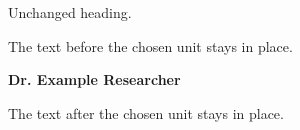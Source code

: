 \documentclass[11pt]{article}
\newcommand{\PersonName}{Dr. Example Researcher}
\begin{document}
Unchanged heading.

The text before the chosen unit stays in place.

\textbf{\PersonName}


\par\vspace{25mm}
The text after the chosen unit stays in place.
\end{document}
